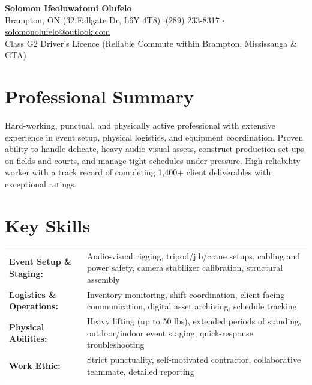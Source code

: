 \documentclass[a4paper,10pt]{article}
\begin{document}
\begin{center}
    {\LARGE \textbf{Solomon Ifeoluwatomi Olufelo}} \\[2pt]
    Brampton, ON (32 Fallgate Dr, L6Y 4T8) \enspace$\cdot$\enspace (289) 233-8317 \enspace$\cdot$\enspace \href{mailto:solomonolufelo@outlook.com}{solomonolufelo@outlook.com} \\
    Class G2 Driver's Licence (Reliable Commute within Brampton, Mississauga \& GTA)
\end{center}

\section*{Professional Summary}
Hard-working, punctual, and physically active professional with extensive experience in event setup, physical logistics, and equipment coordination. Proven ability to handle delicate, heavy audio-visual assets, construct production set-ups on fields and courts, and manage tight schedules under pressure. High-reliability worker with a track record of completing 1,400+ client deliverables with exceptional ratings.

\section*{Key Skills}
\begin{tabularx}{\textwidth}{@{}lX@{}}
\textbf{Event Setup \& Staging:} & Audio-visual rigging, tripod/jib/crane setups, cabling and power safety, camera stabilizer calibration, structural assembly \\
\textbf{Logistics \& Operations:} & Inventory monitoring, shift coordination, client-facing communication, digital asset archiving, schedule tracking \\
\textbf{Physical Abilities:} & Heavy lifting (up to 50 lbs), extended periods of standing, outdoor/indoor event staging, quick-response troubleshooting \\
\textbf{Work Ethic:} & Strict punctuality, self-motivated contractor, collaborative teammate, detailed reporting \\
\end{tabularx}
\end{document}
